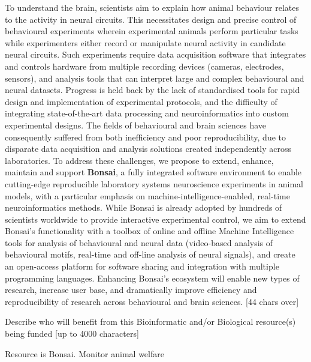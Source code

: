 To understand the brain, scientists aim to explain how animal behaviour relates to the activity in neural circuits. This necessitates design and precise control of behavioural experiments wherein experimental animals perform particular tasks while experimenters either record or manipulate neural activity in candidate neural circuits. Such experiments require data acquisition software that integrates and controls hardware from multiple recording devices (cameras, electrodes, sensors), and analysis tools that can interpret large and complex behavioural and neural datasets. Progress is held back by the lack of standardised tools for rapid design and implementation of experimental protocols, and the difficulty of integrating state-of-the-art data processing and neuroinformatics into custom experimental designs. The fields of behavioural and brain sciences have consequently suffered from both inefficiency and poor reproducibility, due to disparate data acquisition and analysis solutions created independently across laboratories.   
To address these challenges, we propose  to  extend,  enhance,  maintain  and  support \textbf{Bonsai},  a  fully  integrated  software  environment  to enable cutting-edge reproducible laboratory systems neuroscience experiments in animal models, with a particular emphasis on machine-intelligence-enabled, real-time neuroinformatics methods. While Bonsai is already adopted by hundreds of scientists worldwide to provide interactive experimental control, we aim to extend Bonsai’s functionality with a toolbox of online and offline Machine Intelligence tools for analysis of behavioural and neural data (video-based analysis of behavioural motifs, real-time and off-line analysis of neural signals), and create an open-access platform for software sharing and integration with multiple programming languages. Enhancing Bonsai's ecosystem will enable new types of research, increase user base, and dramatically improve efficiency and reproducibility of research across behavioural and brain sciences.
[44 chars over]


Describe who will benefit from this Bioinformatic and/or Biological resource(s) being funded [up to 4000 characters]

Resource is Bonsai.
Monitor animal welfare


